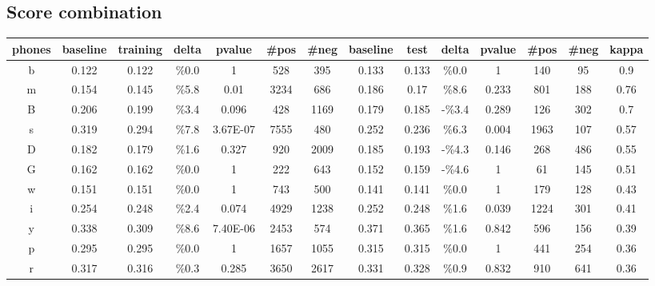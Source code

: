 
\subsection{Score combination}

\begin{table}[H]
\tiny{
\centering
\renewcommand{\arraystretch}{2}

\begin{tabular}{|c| |c|c|c|c|c|c| |c|c|c|c|c|c| |c|}
\hline
phones & baseline & training & delta & pvalue & \#pos & \#neg & baseline & test & delta & pvalue & \#pos &  \#neg & kappa \\ \hline
b & 0.122 & 0.122 & \%0.0 & 1 & 528 & 395 & 0.133 & 0.133 & \%0.0 & 1 & 140 & 95 & 0.9 \\ \hline
\rowcolor{lightgray} m & 0.154 & 0.145 & \%5.8 & 0.01 & 3234 & 686 & 0.186 & 0.17 & \%8.6 & 0.233 & 801 & 188 & 0.76 \\ \hline
B & 0.206 & 0.199 & \%3.4 & 0.096 & 428 & 1169 & 0.179 & 0.185 & -\%3.4 & 0.289 & 126 & 302 & 0.7 \\ \hline
\rowcolor{lightgray} s & 0.319 & 0.294 & \%7.8 & 3.67E-07 & 7555 & 480 & 0.252 & 0.236 & \%6.3 & 0.004 & 1963 & 107 & 0.57 \\ \hline
D & 0.182 & 0.179 & \%1.6 & 0.327 & 920 & 2009 & 0.185 & 0.193 & -\%4.3 & 0.146 & 268 & 486 & 0.55 \\ \hline
G & 0.162 & 0.162 & \%0.0 & 1 & 222 & 643 & 0.152 & 0.159 & -\%4.6 & 1 & 61 & 145 & 0.51 \\ \hline
w & 0.151 & 0.151 & \%0.0 & 1 & 743 & 500 & 0.141 & 0.141 & \%0.0 & 1 & 179 & 128 & 0.43 \\ \hline
i & 0.254 & 0.248 & \%2.4 & 0.074 & 4929 & 1238 & 0.252 & 0.248 & \%1.6 & 0.039 & 1224 & 301 & 0.41 \\ \hline
\rowcolor{lightgray} y & 0.338 & 0.309 & \%8.6 & 7.40E-06 & 2453 & 574 & 0.371 & 0.365 & \%1.6 & 0.842 & 596 & 156 & 0.39 \\ \hline
p & 0.295 & 0.295 & \%0.0 & 1 & 1657 & 1055 & 0.315 & 0.315 & \%0.0 & 1 & 441 & 254 & 0.36 \\ \hline
r & 0.317 & 0.316 & \%0.3 & 0.285 & 3650 & 2617 & 0.331 & 0.328 & \%0.9 & 0.832 & 910 & 641 & 0.36 \\ \hline

\end{tabular}}
\end{table}
